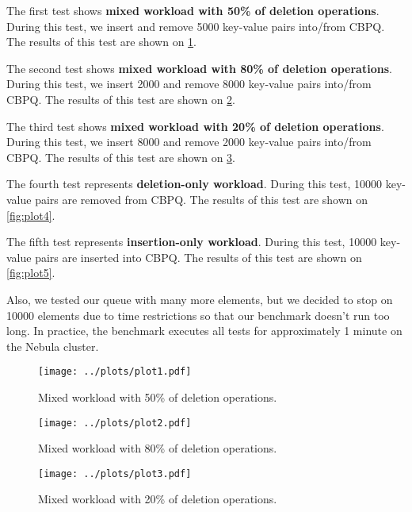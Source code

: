 \documentclass{article}
\begin{document}
  The first test shows\textbf{ mixed workload with 50\% of deletion operations}. During this test, we insert and remove 5000 key-value pairs into/from CBPQ. The results of this test are shown on \cref{fig:plot1}.\par

  The second test shows \textbf{mixed workload with 80\% of deletion operations}. During this test, we insert 2000 and remove 8000 key-value pairs into/from CBPQ. The results of this test are shown on \cref{fig:plot2}.\par

  The third test shows \textbf{mixed workload with 20\% of deletion operations}. During this test, we insert 8000 and remove 2000 key-value pairs into/from CBPQ. The results of this test are shown on \cref{fig:plot3}.\par

  The fourth test represents \textbf{deletion-only workload}. During this test, 10000 key-value pairs are removed from CBPQ. The results of this test are shown on \cref{fig:plot4}.\par

  The fifth test represents \textbf{insertion-only workload}. During this test, 10000 key-value pairs are inserted into CBPQ. The results of this test are shown on \cref{fig:plot5}.\par

  Also, we tested our queue with many more elements, but we decided to stop on 10000 elements due to time restrictions so that our benchmark doesn't run too long. In practice, the benchmark executes all tests for approximately 1 minute on the Nebula cluster.

  \begin{figure}[H]
    \centering
    \texttt{[image: ../plots/plot1.pdf]}
    \caption{Mixed workload with 50\% of deletion operations.}
    \label{fig:plot1}
  \end{figure}

  \begin{figure}[H]
    \centering
    \texttt{[image: ../plots/plot2.pdf]}
    \caption{Mixed workload with 80\% of deletion operations.}
    \label{fig:plot2}
  \end{figure}

  \begin{figure}[H]
    \centering
    \texttt{[image: ../plots/plot3.pdf]}
    \caption{Mixed workload with 20\% of deletion operations.}
    \label{fig:plot3}
  \end{figure}
\end{document}
